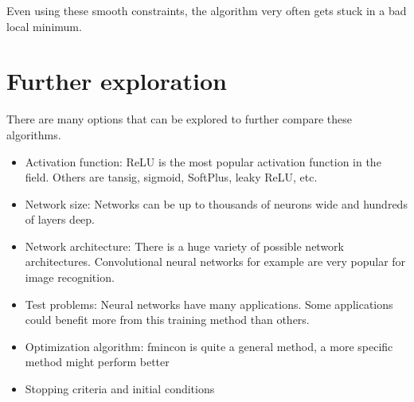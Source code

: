 Even using these smooth constraints, the algorithm very often gets stuck in a bad local minimum.
\section{Further exploration}
There are many options that can be explored to further compare these algorithms.

\begin{itemize}
\item Activation function: ReLU is the most popular activation function in the field. Others are tansig, sigmoid, SoftPlus, leaky ReLU, etc.
\item Network size: Networks can be up to thousands of neurons wide and hundreds of layers deep. 
\item Network architecture: There is a huge variety of possible network architectures. Convolutional neural networks for example are very popular for image recognition.
\item Test problems: Neural networks have many applications. Some applications could benefit more from this training method than others.
\item Optimization algorithm: fmincon is quite a general method, a more specific method might perform better
\item Stopping criteria and initial conditions

\end{itemize}




